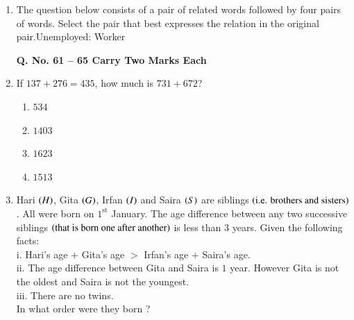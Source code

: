 \documentclass[journal,12pt,onecolumn]{IEEEtran}
\theoremstyle{remark}
\begin{document}
\begin{enumerate}
		\item The question below consists of a pair of related words followed by four pairs of words. Select the pair that best expresses the relation in the original pair.Unemployed: Worker
		\hfill{}
		
		\begin{enumerate}
		\end{enumerate}
\textbf{\large{Q. No. 61 – 65 Carry Two Marks Each}}
\item If $137 + 276 = 435$, how much is $731 + 672$?
		\hfill{\brak{\text{GATE CS 2010}}}
	
	\begin{multicols}{4}
		\begin{enumerate}
			\item $534$
			\item $1403$
			\item $1623$
			\item $1513$
		\end{enumerate}
	\end{multicols}
	\item Hari $\left(H\right)$, Gita $\left(G\right)$, Irfan $\left(I\right)$ and Saira $\left(S\right)$ are siblings $\left(\text{i.e. brothers and sisters}\right)$. All were born on $1^{\text{st}}$ January. The age difference between any two successive siblings $\left(\text{that is born one after another}\right)$ is less than $3$ years. Given the following facts:\\
i. Hari's age $+$ Gita's age $>$ Irfan's age $+$ Saira's age.\\
ii. The age difference between Gita and Saira is $1$ year. However Gita is not the oldest and Saira is not the youngest.\\
iii. There are no twins.\\
In what order were they born ?
\hfill{}
		
		\begin{enumerate}
			\begin{multicols}{4}
				\item HSIG
				\item SGHI
				\item IGSH
				\item IHSG
			\end{multicols}
		\end{enumerate}
		

\end{enumerate}
\end{document}
